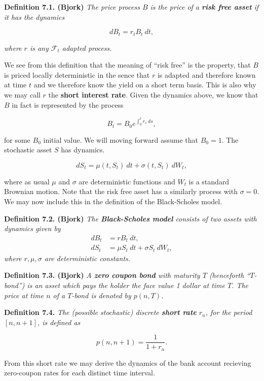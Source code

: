 \documentclass[
]{book}
\begin{document}
\textbf{Definition 7.1. (Bjork)} \emph{The price process \(B\) is the price of a \textbf{risk free asset} if it has the dynamics}

\[
dB_t=r_t B_t\ dt,\tag{7.1}
\]

\emph{where \(r\) is any \(\mathcal{F}_t\) adapted process.}

We see from this definition that the meaning of ``risk free'' is the property, that \(B\) is priced locally deterministic in the sence that \(r\) is adapted and therefore known at time \(t\) and we therefore know the yield on a short term basis. This is also why we may call \(r\) the \textbf{short interest rate}. Given the dynamics above, we know that \(B\) in fact is represented by the process

\[
B_t=B_0e^{\int_0^tr_s\ ds},
\]

for some \(B_0\) initial value. We will moving forward assume that \(B_0=1\). The stochastic asset \(S\) has dynamics.

\[
dS_t=\mu(t,S_t)\ dt + \sigma(t,S_t)\ dW_t,\tag{7.2}
\]

where as usual \(\mu\) and \(\sigma\) are deterministic functions and \(W_t\) is a standard Brownian motion. Note that the risk free asset has a similarly process with \(\sigma = 0\). We may now include this in the definition of the Black-Scholes model.

\textbf{Definition 7.2. (Bjork)} \emph{The \textbf{Black-Scholes model} consists of two assets with dynamics given by}
\begin{align*}
dB_t&=rB_t\ dt,\tag{7.3}\\
dS_t&=\mu S_t\ dt+\sigma S_t\ dW_t,\tag{7.4}
\end{align*}
\emph{where \(r,\mu,\sigma\) are deterministic constants.}

\textbf{Definition 7.3. (Bjork)} \emph{A \textbf{zero coupon bond} with maturity \(T\) (henceforth ``\(T\)-bond'') is an asset which pays the holder the face value 1 dollar at time \(T\). The price at time \(n\) of a \(T\)-bond is denoted by \(p(n,T)\).}

\textbf{Definition 7.4.} \emph{The (possible stochastic) discrete \textbf{short rate} \(r_n\), for the period \([n,n+1]\), is defined as}

\[
p(n,n+1)=\frac{1}{1+ r_n}.\tag{7.6}
\]

From this short rate we may derive the dynamics of the bank account recieving zero-coupon rates for each distinct time interval.
\end{document}
